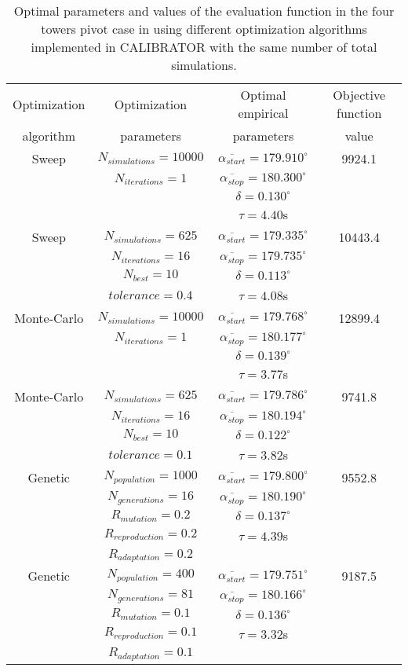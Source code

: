 \documentclass[review,authoryear]{elsarticle}
\newcommand{\TABLE}[5]
{
	\begin{table}[ht!]
		\centering
		\caption{#4.\label{#5}}
		#1
		\begin{tabular}{#2}
			#3
		\end{tabular}
	\end{table}
}
\begin{document}
\TABLE{\scriptsize}{cccc}
{
	Optimization & Optimization & Optimal empirical & Objective function
	\\ algorithm & parameters & parameters & value
	\\ \hline
	Sweep & $N_{simulations}=10000$ & $\overline{\alpha_{start}}=179.910^\circ$
	& 9924.1
	\\ & $N_{iterations}=1$ & $\overline{\alpha_{stop}}=180.300^\circ$
	\\ & & $\delta=0.130^\circ$
	\\ & & $\tau=4.40$s
	\\ \hline
	Sweep & $N_{simulations}=625$ & $\overline{\alpha_{start}}=179.335^\circ$
	& 10443.4
	\\ & $N_{iterations}=16$ & $\overline{\alpha_{stop}}=179.735^\circ$
	\\ & $N_{best}=10$ & $\delta=0.113^\circ$
	\\ & $tolerance=0.4$ & $\tau=4.08$s
	\\ \hline
	Monte-Carlo & $N_{simulations}=10000$
	& $\overline{\alpha_{start}}=179.768^\circ$ & 12899.4
	\\ & $N_{iterations}=1$ & $\overline{\alpha_{stop}}=180.177^\circ$
	\\ & & $\delta=0.139^\circ$
	\\ & & $\tau=3.77$s
	\\ \hline
	Monte-Carlo & $N_{simulations}=625$
	& $\overline{\alpha_{start}}=179.786^\circ$ & 9741.8
	\\ & $N_{iterations}=16$ & $\overline{\alpha_{stop}}=180.194^\circ$
	\\ & $N_{best}=10$ & $\delta=0.122^\circ$
	\\ & $tolerance=0.1$ & $\tau=3.82$s
	\\ \hline
	Genetic & $N_{population}=1000$ & $\overline{\alpha_{start}}=179.800^\circ$
	& 9552.8
	\\ & $N_{generations}=16$ & $\overline{\alpha_{stop}}=180.190^\circ$
	\\ & $R_{mutation}=0.2$ & $\delta=0.137^\circ$
	\\ & $R_{reproduction}=0.2$ & $\tau=4.39$s
	\\ & $R_{adaptation}=0.2$
	\\ \hline
	Genetic & $N_{population}=400$ & $\overline{\alpha_{start}}=179.751^\circ$
	& 9187.5
	\\ & $N_{generations}=81$ & $\overline{\alpha_{stop}}=180.166^\circ$
	\\ & $R_{mutation}=0.1$ & $\delta=0.136^\circ$
	\\ & $R_{reproduction}=0.1$ & $\tau=3.32$s
	\\ & $R_{adaptation}=0.1$
	\\ \hline
}{Optimal parameters and values of the evaluation function in the four towers pivot case in \citet{Ouazaa15} using different optimization algorithms implemented in CALIBRATOR with the same number of total simulations}{TabPivot}
\end{document}
